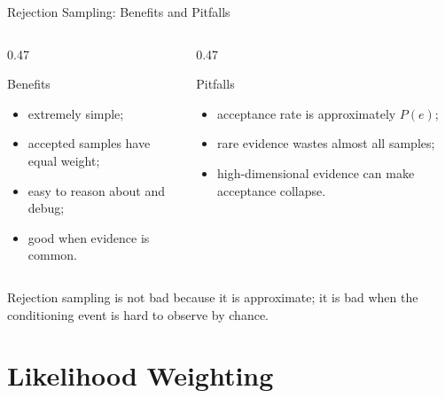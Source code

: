 \documentclass[aspectratio=169,10pt]{beamer}
\begin{document}
\begin{frame}[shrink=10]{Rejection Sampling: Benefits and Pitfalls}
  \begin{columns}[T,onlytextwidth]
    \begin{column}{0.47\textwidth}
      \begin{block}{Benefits}
        \begin{itemize}
          \item extremely simple;
          \item accepted samples have equal weight;
          \item easy to reason about and debug;
          \item good when evidence is common.
        \end{itemize}
      \end{block}
    \end{column}
    \begin{column}{0.47\textwidth}
      \begin{block}{Pitfalls}
        \begin{itemize}
          \item acceptance rate is approximately $P(e)$;
          \item rare evidence wastes almost all samples;
          \item high-dimensional evidence can make acceptance collapse.
        \end{itemize}
      \end{block}
    \end{column}
  \end{columns}

  \begin{keyidea}
    Rejection sampling is not bad because it is approximate; it is bad when the conditioning event is hard to observe by chance.
  \end{keyidea}
\end{frame}

\section{Likelihood Weighting}
\end{document}
